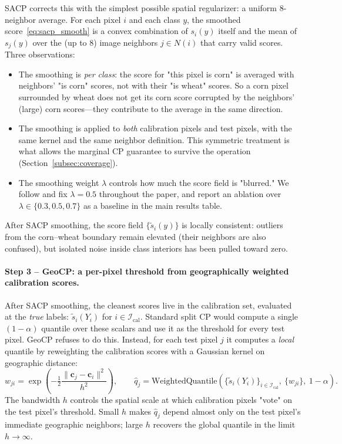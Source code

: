 \documentclass[11pt]{article}
\newcommand{\1}{\mathbf{1}}
\begin{document}
SACP corrects this with the simplest possible spatial regularizer: a uniform 8-neighbor average. For each pixel $i$ and each class $y$, the smoothed score~\eqref{eq:sacp_smooth} is a convex combination of $s_i(y)$ itself and the mean of $s_j(y)$ over the (up to 8) image neighbors $j \in N(i)$ that carry valid scores. Three observations:
\begin{itemize}[topsep=2pt,itemsep=2pt,leftmargin=1.5em]
    \item The smoothing is \emph{per class}: the score for "this pixel is corn" is averaged with neighbors' "is corn" scores, not with their "is wheat" scores. So a corn pixel surrounded by wheat does not get its corn score corrupted by the neighbors' (large) corn scores---they contribute to the average in the same direction.
    \item The smoothing is applied to \emph{both} calibration pixels and test pixels, with the same kernel and the same neighbor definition. This symmetric treatment is what allows the marginal CP guarantee to survive the operation (Section~\ref{subsec:coverage}).
    \item The smoothing weight $\lambda$ controls how much the score field is "blurred." We follow \citet{liu2024sacp} and fix $\lambda = 0.5$ throughout the paper, and report an ablation over $\lambda \in \{0.3, 0.5, 0.7\}$ as a baseline in the main results table.
\end{itemize}
After SACP smoothing, the score field $\{\tilde s_i(y)\}$ is locally consistent: outliers from the corn--wheat boundary remain elevated (their neighbors are also confused), but isolated noise inside class interiors has been pulled toward zero.

\paragraph{Step 3 -- GeoCP: a per-pixel threshold from geographically weighted calibration scores.}
After SACP smoothing, the cleanest scores live in the calibration set, evaluated at the \emph{true} labels: $\tilde s_i(Y_i)$ for $i \in \mathcal{I}_{\text{cal}}$. Standard split CP would compute a single $(1-\alpha)$ quantile over these scalars and use it as the threshold for every test pixel. GeoCP refuses to do this. Instead, for each test pixel $j$ it computes a \emph{local} quantile by reweighting the calibration scores with a Gaussian kernel on geographic distance:
\begin{equation}
    w_{ji} = \exp\!\left(-\tfrac{1}{2}\frac{\|\mathbf{c}_j - \mathbf{c}_i\|^2}{h^2}\right), \qquad
    \hat q_j = \text{WeightedQuantile}\!\left(\{\tilde s_i(Y_i)\}_{i \in \mathcal{I}_{\text{cal}}},\ \{w_{ji}\},\ 1-\alpha\right).
\end{equation}
The bandwidth $h$ controls the spatial scale at which calibration pixels "vote" on the test pixel's threshold. Small $h$ makes $\hat q_j$ depend almost only on the test pixel's immediate geographic neighbors; large $h$ recovers the global quantile in the limit $h \to \infty$.
\end{document}
